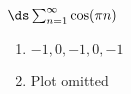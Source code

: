 {$\ds \sum_{n=1}^\infty \cos (\pi n)$
}
{\begin{enumerate}
\item	$-1,0,-1,0,-1$
\item	Plot omitted
\end{enumerate}
}
